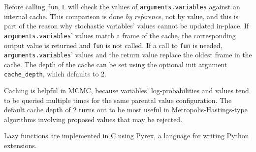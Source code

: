 Before calling \texttt{fun}, \texttt{L} will check the values of \texttt{arguments.variables} against an internal cache. This comparison is done \emph{by reference}, not by value, and this is part of the reason why stochastic variables' values cannot be updated in-place. If \texttt{arguments.variables}' values match a frame of the cache, the corresponding output value is returned and \texttt{fun} is not called. If a call to \texttt{fun} is needed, \texttt{arguments.variables}' values and the return value replace the oldest frame in the cache. The depth of the cache can be set using the optional init argument \texttt{cache_depth}, which defaults to 2.

Caching is helpful in MCMC, because variables' log-probabilities and values tend to be queried multiple times for the same parental value configuration. The default cache depth of 2 turns out to be most useful in Metropolis-Hastings-type algorithms involving proposed values that may be rejected.

Lazy functions are implemented in C using Pyrex, a language for writing Python extensions.